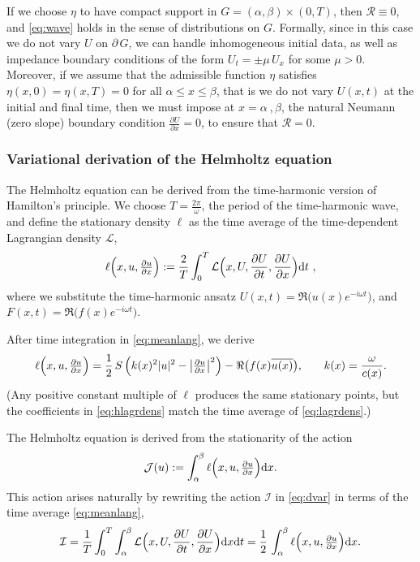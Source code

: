 \documentclass[twoside,11pt]{article}
\def\d{{\mathrm d}}
\begin{document}
{If we choose  $\eta$ to have compact support in $G=(\alpha, \beta)\times(0,T)$, then $\mathcal{R}\equiv 0$, and \eqref{eq:wave} holds in the sense of distributions on $G$.
 {Formally, since in this case we do not vary  $U$ on $\partial\, G$, we can handle inhomogeneous initial data, as well as impedance boundary conditions of the form $U_{t}=\pm \mu \, U_{x}$ for some $\mu >0$.
Moreover, if we assume that the admissible function $\eta$ satisfies $\eta(x,0)=\eta(x,T)=0$ for all $\alpha \le x \le \beta$, that is we do not vary $U(x,t)$ at the initial and final time, then  we must impose at $x=\alpha \ , \beta$, the natural Neumann (zero slope) boundary condition $\frac{\partial U}{\partial x}=0$,   to ensure that ${\mathcal{R}}=0$. }

\subsubsection*{Variational derivation of the Helmholtz equation}

The Helmholtz equation can be derived from the time-harmonic version of Hamilton's principle. We choose $T=\frac{2\pi}{\omega}$, the period of the time-harmonic wave, and define the stationary density $\ell$ as
the time average of the time-dependent Lagrangian density $ \mathcal{L}$,
\begin{equation}\label{eq:meanlang}
\ell\Bigl(x,u,\tfrac{\partial u}{\partial x}\Bigr)
:= \frac{2}{T}\int_{0}^{T} \mathcal{L}\Bigl(x, {U},\frac{\partial U}{\partial t},\frac{\partial U}{\partial x}\Bigr)  \d t \ ,
\end{equation}
where we substitute the time-harmonic ansatz $U(x,t)=\Re\bigl(u(x) e^{-i\omega t}\bigr)$, and $F(x,t)=\Re\bigl(f(x) e^{-i\omega t}\bigr)$.

After time integration in \eqref{eq:meanlang}, we derive
\begin{equation}\label{eq:hlagrdens}
\ell\Bigl(x,u,\tfrac{\partial u}{\partial x}\Bigr)
=  {\frac 12 \, S\, \Bigl(k(x)^2 |u|^2- \bigl|\tfrac{\partial u}{\partial x}\bigr|^2\Bigr) -  \Re\bigl(f(x) \overline{u(x)}\bigr),}
\qquad k(x)=\frac{\omega}{c(x)}.
\end{equation}
 {(Any positive constant multiple of $\ell$ produces the same stationary points, but the coefficients in \eqref{eq:hlagrdens} match the time average of \eqref{eq:lagrdens}.)}

The Helmholtz equation is derived from the stationarity of the action
\begin{equation}
\mathcal{J} (u) := \int_{\alpha}^{\beta} \ell\Bigl(x,u,\tfrac{\partial u}{\partial x}\Bigr)  \d x .
\end{equation}
This action arises naturally by rewriting the action $\mathcal{I}$ in \eqref{eq:dvar} in terms of the time average \eqref{eq:meanlang},
\begin{align}\label{eq:dvarh}
\mathcal{I} =  \frac{1}{T}\int_{0}^{T}\int_{\alpha}^{\beta} \mathcal{L}\Bigl(x, {U},\frac{\partial U}{\partial t},\frac{\partial U}{\partial x}\Bigr)  \d x  \d t
=  \frac12 \,\int_{\alpha}^{\beta} \ell\Bigl(x,u,\tfrac{\partial u}{\partial x}\Bigr)  \d x .
\end{align}


}
\end{document}
